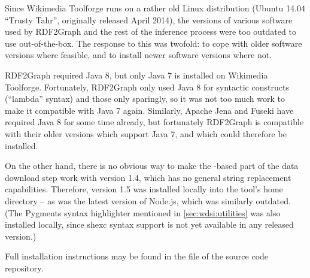 Since \gls{Wikimedia Toolforge} runs on a rather old Linux distribution
(Ubuntu 14.04 “Trusty Tahr”, originally released April 2014),
the versions of various software used by \gls{RDF2Graph} and the rest of the inference process
were too outdated to use out-of-the-box.
The response to this was twofold:
to cope with older software versions where feasible,
and to install newer software versions where not.

\Gls{RDF2Graph} required Java 8,
but only Java 7 is installed on \gls{Wikimedia Toolforge}.
Fortunately, \gls{RDF2Graph} only used Java 8 for syntactic constructs (“lambda” syntax)
and those only sparingly, so it was not too much work to make it compatible with Java 7 again.
Similarly, Apache Jena and Fuseki have required Java 8 for some time already,
but fortunately \gls{RDF2Graph} is compatible with their older versions which support Java 7,
and which could therefore be installed.

On the other hand, there is no obvious way to make the -based part of the data download step
work with  version 1.4, which has no general string replacement capabilities.
Therefore,  version 1.5 was installed locally into the tool’s home directory –
as was the latest version of \gls{Node.js}, which was similarly outdated.
(The Pygments syntax highlighter mentioned in \cref{sec:wdsi:utilities} was also installed locally,
since \gls{shexc} syntax support is not yet available in any released version.)

Full installation instructions may be found in the  file of the source code repository.
